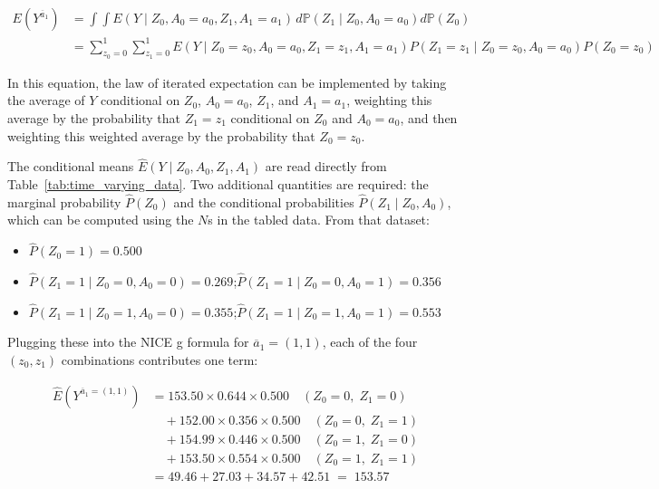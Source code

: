 \documentclass[12pt]{article}
\numberwithin{equation}{section}
\begin{document}
\begin{align*}
E(Y^{\overline{a}_1}) & = \int \int E(Y \mid Z_0, A_0 = a_0, Z_1, A_1 = a_1)\,d\mathbb{P}(Z_1\mid Z_0, A_0 = a_0)d\mathbb{P}(Z_0)\\
					  & = \sum_{z_0 = 0}^1 \sum_{z_1=0}^1 E(Y \mid Z_0 = z_0, A_0 = a_0, Z_1 = z_1, A_1 = a_1)P(Z_1 = z_1 \mid Z_0 = z_0, A_0 = a_0)P(Z_0 = z_0)
\end{align*}

In this equation, the law of iterated expectation can be implemented by taking the average of $Y$ conditional on $Z_0$, $A_0 = a_0$, $Z_1$, and $A_1 = a_1$, weighting this average by the probability that $Z_1 = z_1$ conditional on $Z_0$ and $A_0 = a_0$, and then weighting this weighted average by the probability that $Z_0 = z_0$.

The conditional means $\hat{E}(Y \mid Z_0, A_0, Z_1, A_1)$ are read directly from Table~\ref{tab:time_varying_data}. Two additional quantities are required: the marginal probability $\hat{P}(Z_0)$ and the conditional probabilities $\hat{P}(Z_1 \mid Z_0, A_0)$, which can be computed using the $N$s in the tabled data. From that dataset:

\begin{itemize}
  \item $\hat{P}(Z_0 = 1) = 0.500$
  \item $\hat{P}(Z_1 = 1 \mid Z_0 = 0, A_0 = 0) = 0.269$;\quad $\hat{P}(Z_1 = 1 \mid Z_0 = 0, A_0 = 1) = 0.356$
  \item $\hat{P}(Z_1 = 1 \mid Z_0 = 1, A_0 = 0) = 0.355$;\quad $\hat{P}(Z_1 = 1 \mid Z_0 = 1, A_0 = 1) = 0.553$
\end{itemize}

Plugging these into the NICE g formula for $\overline{a}_1 = (1,1)$, each of the four $(z_0, z_1)$ combinations contributes one term:

\begin{align*}
\hat{E}(Y^{\overline{a}_1=(1,1)})
  &= 153.50 \times 0.644 \times 0.500 \quad (Z_0=0,\;Z_1=0) \\
  &\quad + 152.00 \times 0.356 \times 0.500 \quad (Z_0=0,\;Z_1=1) \\
  &\quad + 154.99 \times 0.446 \times 0.500 \quad (Z_0=1,\;Z_1=0) \\
  &\quad + 153.50 \times 0.554 \times 0.500 \quad (Z_0=1,\;Z_1=1) \\
  &= 49.46 + 27.03 + 34.57 + 42.51 \;=\; 153.57
\end{align*}
\end{document}
